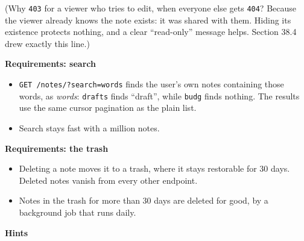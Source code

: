 (Why \texttt{403} for a viewer who tries to edit, when everyone else gets \texttt{404}? Because the viewer already knows the note exists: it was shared with them. Hiding its existence protects nothing, and a clear ``read-only'' message helps. Section 38.4 drew exactly this line.)

\textbf{Requirements: search}

\begin{itemize}
\tightlist
\item
  \texttt{GET\ /}\allowbreak{}\texttt{notes/}\allowbreak{}\texttt{?}\allowbreak{}\texttt{search=}\allowbreak{}\texttt{words} finds the user's own notes containing those words, as \emph{words}: \texttt{drafts} finds ``draft'', while \texttt{budg} finds nothing. The results use the same cursor pagination as the plain list.
\item
  Search stays fast with a million notes.
\end{itemize}

\noindent{}\textbf{Requirements: the trash}

\begin{itemize}
\tightlist
\item
  Deleting a note moves it to a trash, where it stays restorable for 30 days. Deleted notes vanish from every other endpoint.
\item
  Notes in the trash for more than 30 days are deleted for good, by a background job that runs daily.
\end{itemize}

\noindent{}\textbf{Hints}

